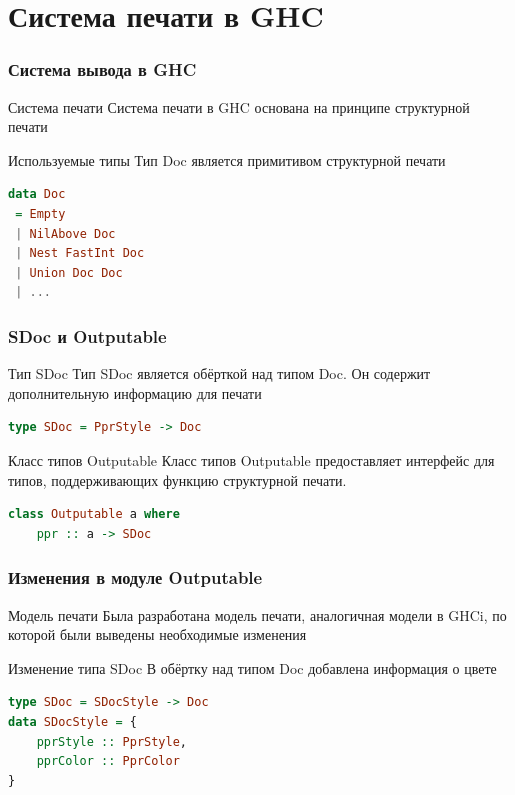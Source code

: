\documentclass[utf8,russian]{beamer}
\begin{document}
\section{Система печати в GHC}

\begin{frame}[fragile]
\frametitle{Система вывода в GHC}
\begin{block}{Система печати}
Система печати в GHC основана на принципе структурной печати
\end{block}

\begin{block}{Используемые типы}
Тип Doc является примитивом структурной печати
\begin{lstlisting}[language=Haskell]
data Doc
 = Empty
 | NilAbove Doc
 | Nest FastInt Doc
 | Union Doc Doc
 | ...
\end{lstlisting}
\end{block}
\end{frame}

\begin{frame}[fragile]
\frametitle{SDoc и Outputable}

\begin{block}{Тип SDoc}
Тип SDoc является обёрткой над типом Doc. Он содержит дополнительную информацию для печати
\begin{lstlisting}[language=Haskell]
type SDoc = PprStyle -> Doc
\end{lstlisting}
\end{block}

\begin{block}{Класс типов Outputable}
Класс типов Outputable предоставляет интерфейс для типов, поддерживающих функцию структурной печати.
\begin{lstlisting}[language=Haskell]
class Outputable a where
	ppr :: a -> SDoc
\end{lstlisting}
\end{block}

\end{frame}

\begin{frame}[fragile]
\frametitle{Изменения в модуле Outputable}

\begin{block}{Модель печати}
Была разработана модель печати, аналогичная модели в GHCi, по которой были выведены необходимые изменения
\end{block}

\begin{block}{Изменение типа SDoc}
В обёртку над типом Doc добавлена информация о цвете
\begin{lstlisting}[language=Haskell]
type SDoc = SDocStyle -> Doc
data SDocStyle = {
    pprStyle :: PprStyle,
    pprColor :: PprColor
}
\end{lstlisting}
\end{block}
\end{frame}
\end{document}
